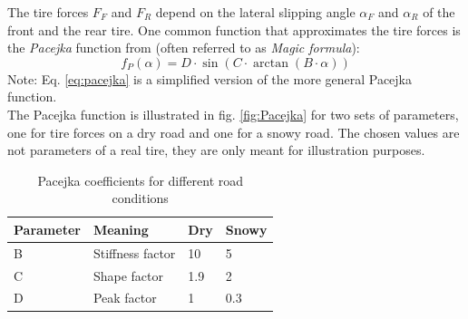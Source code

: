 The tire forces $F_F$ and $F_R$ depend on the lateral slipping angle $\alpha_F$ and $\alpha_R$ of the front and the rear tire. One common function that approximates the tire forces is the \emph{Pacejka} function from \cite{pacejka1987} (often referred to as \emph{Magic formula}):
\begin{equation}\label{eq:pacejka}
f_P(\alpha) = D\cdot\sin(C\cdot\arctan(B\cdot\alpha))
\end{equation}
Note: Eq. \ref{eq:pacejka} is a simplified version of the more general Pacejka function.\\
The Pacejka function is illustrated in fig. \ref{fig:Pacejka} for two sets of parameters, one for tire forces on a dry road and one for a snowy road. The chosen values are not parameters of a real tire, they are only meant for illustration purposes.
\begin{table}[h!]
\centering
\begin{tabular}{l|l|l|l}
Parameter & Meaning & Dry & Snowy\\
\hline
B & Stiffness factor & 10 & 5\\
C & Shape factor & 1.9 & 2\\
D & Peak factor & 1 & 0.3
\end{tabular}
\caption{Pacejka coefficients for different road conditions}
\label{tab:pacejka}
\end{table}

